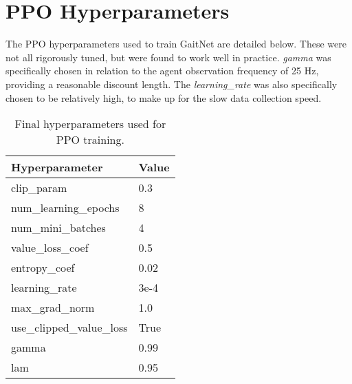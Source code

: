 \section{PPO Hyperparameters}

The PPO hyperparameters used to train GaitNet
are detailed below. These were not all rigorously
tuned, but were found to work well in practice.
\textit{gamma} was specifically chosen in relation
to the agent observation frequency of 25 Hz, providing
a reasonable discount length. The \textit{learning\_rate}
was also specifically chosen to be relatively high,
to make up for the slow data collection speed.

\begin{table}[h!]
  \centering
  \begin{tabular}{ll}
    \hline
    \textbf{Hyperparameter} & \textbf{Value} \\
    \hline
    clip\_param & 0.3 \\
    num\_learning\_epochs & 8 \\
    num\_mini\_batches & 4 \\
    value\_loss\_coef & 0.5 \\
    entropy\_coef & 0.02 \\
    learning\_rate & 3e-4 \\
    max\_grad\_norm & 1.0 \\
    use\_clipped\_value\_loss & True \\
    gamma & 0.99 \\
    lam & 0.95 \\
    \hline
  \end{tabular}
  \caption{Final hyperparameters used for PPO training.}
  \label{tab:ppo-hyperparams}
\end{table}
